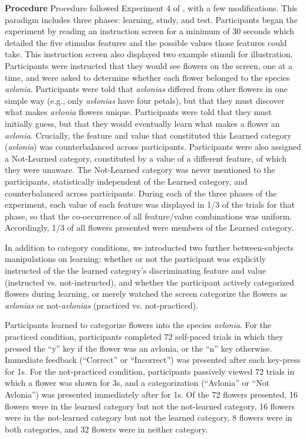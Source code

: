 \documentclass[twocolumn]{svjour3}          %
\begin{document}
\noindent\textbf{Procedure }
Procedure followed Experiment 4 of \citet{DeBrigard2017}, with a few
modifications. This paradigm includes three phases: learning, study,
and test. Participants began the experiment by reading an instruction
screen for a minimum of 30 seconds which detailed the five stimulus
features and the possible values those features could take. This
instruction screen also displayed two example stimuli for
illustration. Participants were instructed that they would see flowers
on the screen, one at a time, and were asked to determine whether each
flower belonged to the species \emph{avlonia}.  Participants were told
that \emph{avlonias} differed from other flowers in one simple way
(e.g., only \emph{avlonias} have four petals), but that they must
discover what makes \emph{avlonia} flowers unique. Participants were
told that they must initially guess, but that they would eventually
learn what makes a flower an \emph{avlonia}. Crucially, the feature
and value that constituted this Learned category (\emph{avlonia}) was
counterbalanced across participants. Participants were also assigned a
Not-Learned category, constituted by a value of a different feature,
of which they were unaware. The Not-Learned category was never
mentioned to the participants, statistically independent of the
Learned category, and counterbalanced across participants. During each
of the three phases of the experiment, each value of each feature was
displayed in 1/3 of the trials for that phase, so that the
co-occurrence of all feature/value combinations was
uniform. Accordingly, 1/3 of all flowers presented were members of the
Learned category.

In addition to category conditions, we introducted two further
between-subjects manipulations on learning: whether or not the
participant was explicitly instructed of the the learned category's
discriminating feature and value (instructed vs. not-instructed), and
whether the participant actively categorized flowers during learning,
or merely watched the screen categorize the flowers as \emph{avlonias}
or not-\emph{avlonias} (practiced vs. not-practiced).

Participants learned to categorize flowers into the species
\emph{avlonia}. For the practiced condition, participants completed 72
self-paced trials in which they pressed the ``y'' key if the flower
was an avlonia, or the ``n'' key otherwise. Immediate feedback
(``Correct'' or ``Incorrect'') was presented after each key-press for
1s. For the not-practiced condition, participants passively viewed 72
trials in which a flower was shown for 3s, and a categorization
(``Avlonia'' or ``Not Avlonia'') was presented immediately after for
1s. Of the 72 flowers presented, 16 flowers were in the learned
category but not the not-learned category, 16 flowers were in the
not-learned category but not the learned category, 8 flowers were in
both categories, and 32 flowers were in neither category.
\end{document}
